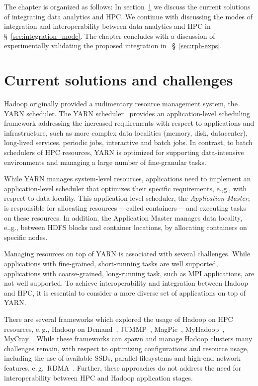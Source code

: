 The chapter is organized as follows: In section~\ref{sec:hpc_hadoop_rel} we discuss the current solutions of integrating data analytics and HPC.
We continue with discussing the modes of integration and interoperability between data analytics and HPC in \S~\ref{sec:integration_mode}.
The chapter concludes with a discussion of experimentally validating the proposed integration in ~\S~\ref{sec:rph-exps}.

\section{Current solutions and challenges}
\label{sec:hpc_hadoop_rel}
Hadoop originally provided a rudimentary resource management system, the YARN scheduler.
The YARN scheduler~\cite{vavilapalli2013apache} provides an application-level scheduling framework addressing the increased requirements with respect to applications and infrastructure, such as more complex data localities (memory, disk, datacenter), long-lived services, periodic jobs, interactive and batch jobs.
In contrast, to batch schedulers of HPC resources, YARN is optimized for supporting data-intensive environments and managing a large number of fine-granular tasks.

While YARN manages system-level resources, applications need to implement an application-level scheduler that optimizes their specific requirements, e.,g., with respect to data locality.
This application-level scheduler, the \textit{Application Master}, is responsible for allocating resources ---called containers---  and executing tasks on these resources.
In addition, the Application Master manages data locality, e.,g., between HDFS blocks and container locations, by allocating containers on specific nodes.

Managing resources on top of YARN is associated with several challenges.
While applications with fine-grained, short-running tasks are well supported, applications with coarse-grained, long-running task, such as MPI applications, are not well supported.
To achieve interoperability and integration between Hadoop and HPC, it is essential to consider a more diverse set of applications on top of YARN.

There are several frameworks which explored the usage of Hadoop on HPC resources, e.\,g., Hadoop on Demand~\cite{hod}, JUMMP~\cite{moody2013jummp}, MagPie~\cite{chu2015magpie}, MyHadoop~\cite{krishnan2011myhadoop}, MyCray~\cite{mycray}.
While these frameworks can spawn and manage Hadoop clusters many challenges remain, with respect to optimizing configurations and resource usage, including the use of available SSDs, parallel filesystems and high-end network features, e.\,g.\ RDMA~\cite{rahman2014homr}.
Further, these approaches do not address the need for interoperability between HPC and Hadoop application stages.

